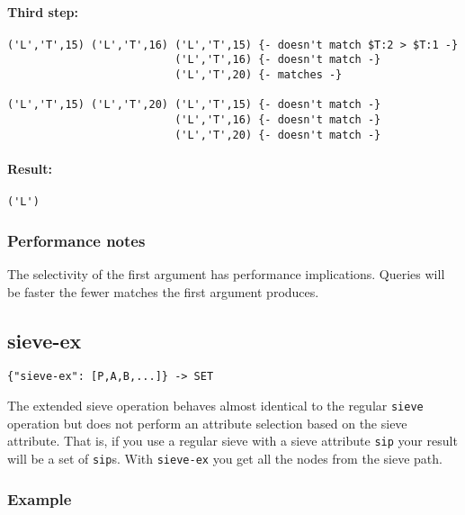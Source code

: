 \documentclass[a4paper]{article}
\begin{document}
\paragraph*{Third step:}

\begin{verbatim}
('L','T',15) ('L','T',16) ('L','T',15) {- doesn't match $T:2 > $T:1 -}
                          ('L','T',16) {- doesn't match -}
                          ('L','T',20) {- matches -}

('L','T',15) ('L','T',20) ('L','T',15) {- doesn't match -}
                          ('L','T',16) {- doesn't match -}
                          ('L','T',20) {- doesn't match -}                      
\end{verbatim}


\paragraph*{Result: }

\begin{verbatim}
('L')
\end{verbatim}

\subsubsection{Performance notes}

The selectivity of the first argument has performance
implications. Queries will be faster the fewer matches the first
argument produces.

\subsection{sieve-ex}

\begin{verbatim}
{"sieve-ex": [P,A,B,...]} -> SET
\end{verbatim}

The extended sieve operation behaves almost identical to the regular \verb|sieve| operation but does not perform an attribute selection based on the sieve attribute.
That is, if you use a regular sieve with a sieve attribute \verb|sip| your result will be a set of \verb|sip|s. With \verb|sieve-ex| you get all the nodes from the sieve
path. 

\subsubsection{Example}
\end{document}

